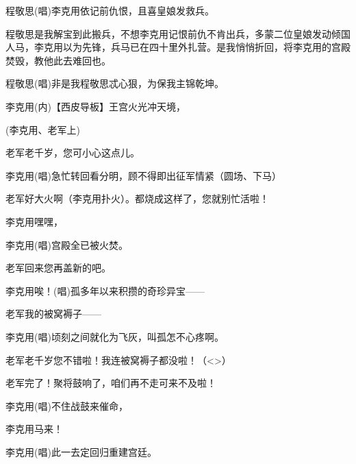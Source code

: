 程敬思\hspace{20pt}({\akai 唱})李克用依记前仇恨，且喜皇娘发救兵。

程敬思\hspace{20pt}是我解宝到此搬兵，不想李克用记恨前仇不肯出兵，多蒙二位皇娘发动倾国人马，李克用以为先锋，兵马已在四十里外扎营。是我悄悄折回，将李克用的宫殿焚毁，教他此去难回也。

程敬思\hspace{20pt}({\akai 唱})非是我程敬思忒心狠，为保我主锦乾坤。

李克用\hspace{20pt}({\akai 内})【{\akai 西皮导板}】王宫火光冲天境，

(李克用、老军{\hwfs 上})

老军\hspace{30pt}老千岁，您可小心这点儿。

李克用\hspace{20pt}({\akai 唱})急忙转回看分明，顾不得即出征军情紧（圆场、下马）

老军\hspace{30pt}好大火啊（李克用扑火）。都烧成这样了，您就别忙活啦！

李克用\hspace{20pt}嘿嘿，

李克用\hspace{20pt}({\akai 唱})宫殿全已被火焚。

老军\hspace{30pt}回来您再盖新的吧。

李克用\hspace{20pt}唉！({\akai 唱})孤多年以来积攒的奇珍异宝------

老军\hspace{30pt}我的被窝褥子------

李克用\hspace{20pt}({\akai 唱})顷刻之间就化为飞灰，叫孤怎不心疼啊。

老军\hspace{30pt}老千岁您不错啦！我连被窝褥子都没啦！（\textless{}\!\textgreater{}）

老军\hspace{30pt}完了！聚将鼓响了，咱们再不走可来不及啦！

李克用\hspace{20pt}({\akai 唱})不住战鼓来催命，

李克用\hspace{20pt}马来！

李克用\hspace{20pt}({\akai 唱})此一去定回归重建宫廷。
